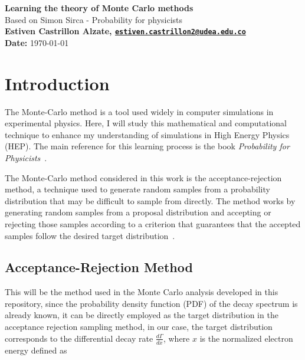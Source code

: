 \documentclass[letterpaper,10pt]{article}
\begin{document}
\begin{titlepage}
    \centering
    \vspace*{2cm}
  
    {\huge\bfseries Learning the theory of Monte Carlo methods}\\[0.3cm]
    
    {\Large Based on Simon Sirca - Probability for physicists}\\[1cm]

    {\normalsize \textbf{Estiven Castrillon Alzate, \href{mailto:estiven.castrillon2@udea.edu.co}{\texttt{estiven.castrillon2@udea.edu.co}}}}\\
    {\normalsize \textbf{Date:} \today}\\[2cm]
\end{titlepage}

\section{Introduction}

The Monte-Carlo method is a tool used widely in computer simulations in experimental physics. Here, I will study this mathematical and computational technique to enhance my understanding of simulations in High Energy Physics (HEP). The main reference for this learning process is the book \textit{Probability for Physicists}~\parencite{Sirca_2016}. 

The Monte-Carlo method considered in this work is the acceptance-rejection method, a technique used to generate random samples from a probability distribution that may be difficult to sample from directly. The method works by generating random samples from a proposal distribution and accepting or rejecting those samples according to a criterion that guarantees that the accepted samples follow the desired target distribution~\parencite{Nakade_2025}.

\subsection{Acceptance-Rejection Method}

This will be the method used in the Monte Carlo analysis developed in this repository, since the probability density function (PDF) of the decay spectrum is already known, it can be directly employed as the target distribution in the acceptance rejection sampling method, in our case, the target distribution corresponds to the differential decay rate $\frac{d\Gamma}{dx}$, 
where \(x\) is the normalized electron energy defined as
\end{document}
